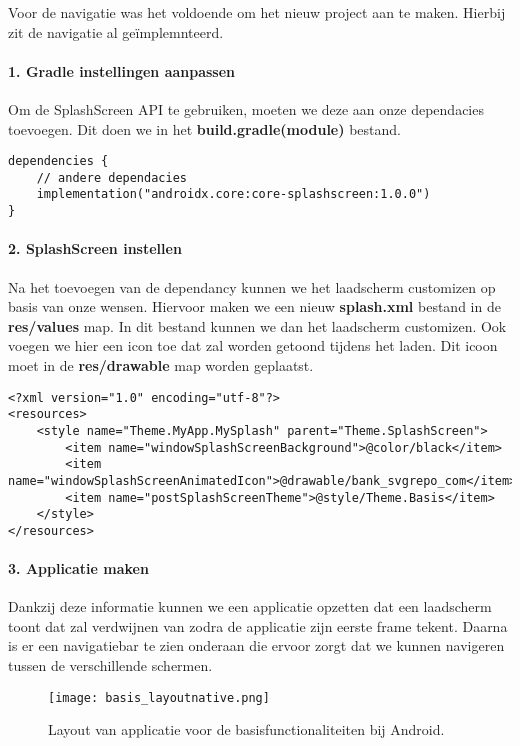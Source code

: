 Voor de navigatie was het voldoende om het nieuw project aan te maken. 
Hierbij zit de navigatie al geïmplemnteerd.

\paragraph{1. Gradle instellingen aanpassen}
Om de SplashScreen API te gebruiken, moeten we deze aan onze dependacies toevoegen. Dit doen we in
het \textbf{build.gradle(module)} bestand.
\begin{verbatim}
dependencies {
    // andere dependacies
    implementation("androidx.core:core-splashscreen:1.0.0")
}
\end{verbatim}

\paragraph{2. SplashScreen instellen}
Na het toevoegen van de dependancy kunnen we het laadscherm customizen op basis van onze wensen. 
Hiervoor maken we een nieuw \textbf{splash.xml} bestand in de \textbf{res/values} map. In dit 
bestand kunnen we dan het laadscherm customizen. Ook voegen we hier een icon toe dat zal worden
getoond tijdens het laden. Dit icoon moet in de \textbf{res/drawable} map worden geplaatst.
\begin{verbatim}
<?xml version="1.0" encoding="utf-8"?>
<resources>
    <style name="Theme.MyApp.MySplash" parent="Theme.SplashScreen">
        <item name="windowSplashScreenBackground">@color/black</item>
        <item name="windowSplashScreenAnimatedIcon">@drawable/bank_svgrepo_com</item>
        <item name="postSplashScreenTheme">@style/Theme.Basis</item>
    </style>
</resources>
\end{verbatim}

\paragraph{3. Applicatie maken}
Dankzij deze informatie kunnen we een applicatie opzetten dat een laadscherm toont dat zal verdwijnen 
van zodra de applicatie zijn eerste frame tekent. Daarna is er een navigatiebar te zien onderaan die ervoor zorgt dat 
we kunnen navigeren tussen de verschillende schermen.
\begin{figure}[H]
    \centering
    \texttt{[image: basis\_layoutnative.png]}
    \caption{Layout van applicatie voor de basisfunctionaliteiten bij Android.}
\end{figure}
